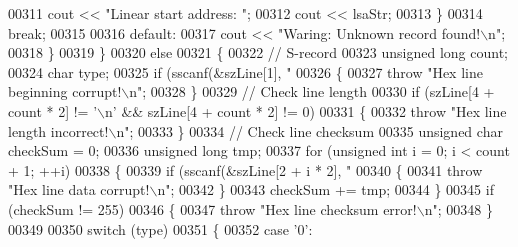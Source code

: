 \begin{DoxyCode}
{{{{{{{{{00311                         cout << \textcolor{stringliteral}{"Linear start address: "};
00312                         cout << lsaStr;
00313                     \}
00314                     \textcolor{keywordflow}{break};
00315 
00316                 \textcolor{keywordflow}{default}:
00317                     cout << \textcolor{stringliteral}{"Waring: Unknown record found!\(\backslash\)n"};
00318                 \}
00319             \}
00320             \textcolor{keywordflow}{else}
00321             \{
00322                 \textcolor{comment}{// S-record}
00323                 \textcolor{keywordtype}{unsigned} \textcolor{keywordtype}{long} count;
00324                 \textcolor{keywordtype}{char}            type;
00325                 \textcolor{keywordflow}{if} (sscanf(&szLine[1], \textcolor{stringliteral}{"%
00326                 \{
00327                     \textcolor{keywordflow}{throw} \textcolor{stringliteral}{"Hex line beginning corrupt!\(\backslash\)n"};
00328                 \}
00329                 \textcolor{comment}{// Check line length}
00330                 \textcolor{keywordflow}{if} (szLine[4 + count * 2] != \textcolor{charliteral}{'\(\backslash\)n'} && szLine[4 + count * 2] != 0)
00331                 \{
00332                     \textcolor{keywordflow}{throw} \textcolor{stringliteral}{"Hex line length incorrect!\(\backslash\)n"};
00333                 \}
00334                 \textcolor{comment}{// Check line checksum}
00335                 \textcolor{keywordtype}{unsigned} \textcolor{keywordtype}{char}   checkSum = 0;
00336                 \textcolor{keywordtype}{unsigned} \textcolor{keywordtype}{long}   tmp;
00337                 \textcolor{keywordflow}{for} (\textcolor{keywordtype}{unsigned} \textcolor{keywordtype}{int} i = 0; i < count + 1; ++i)
00338                 \{
00339                     \textcolor{keywordflow}{if} (sscanf(&szLine[2 + i * 2], \textcolor{stringliteral}{"%
00340                     \{
00341                         \textcolor{keywordflow}{throw} \textcolor{stringliteral}{"Hex line data corrupt!\(\backslash\)n"};
00342                     \}
00343                     checkSum += tmp;
00344                 \}
00345                 \textcolor{keywordflow}{if} (checkSum != 255)
00346                 \{
00347                     \textcolor{keywordflow}{throw} \textcolor{stringliteral}{"Hex line checksum error!\(\backslash\)n"};
00348                 \}
00349 
00350                 \textcolor{keywordflow}{switch} (type)
00351                 \{
00352                 \textcolor{keywordflow}{case} \textcolor{charliteral}{'0'}:
}}}}}}}}}}}
\end{DoxyCode}
